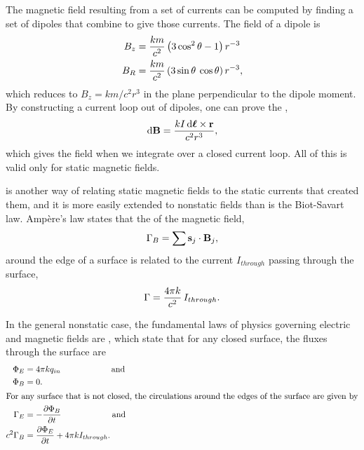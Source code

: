 	The magnetic field resulting from a set of currents can be
	computed by finding a set of dipoles that combine to give
	those currents. The field of a dipole is
	\begin{align*}
		B_z	&= \frac{km}{c^2}\left(3\cos^2\theta-1\right)r^{-3}\\
		B_R	&= \frac{km}{c^2}\left(3\sin\theta\:\cos\theta\right)r^{-3},\\
	\end{align*}
	which reduces to $B_z=km/c^2r^3$ in the plane perpendicular to the
	dipole moment. By constructing a current loop out of dipoles, 
	one can prove the ,
	\begin{equation*}
	  \operatorname{d\!} \mathbf{B} = \frac{kI\operatorname{d\!} \boldsymbol{\ell}\times\mathbf{r}}{c^2r^3},
	\end{equation*}
	which gives the field when we integrate over a closed current loop.
	All of this is valid only for static magnetic fields.
	
	 is another way of relating static magnetic fields to the static currents
	that created them, and it is more easily extended to nonstatic fields than is the
	Biot-Savart law. Amp\`{e}re's law states that the  of the magnetic
	field,
	\begin{equation*}
		\Gamma_B = \sum \mathbf{s}_j\cdot\mathbf{B}_j,
	\end{equation*}
	around the edge of a surface is related to the current $I_{through}$ passing through
	the surface,
	\begin{equation*}
		\Gamma = \frac{4\pi k}{c^2}\,I_{through}.
	\end{equation*}

	In the general nonstatic case, the fundamental laws of physics governing
	electric and magnetic fields are , which state that
	for any closed surface, the fluxes through the surface are
	\begin{align*}
		\Phi_E		&= 4\pi kq_{in} \qquad\qquad\qquad \text{and}\\
		\Phi_B		&= 0.\\
	\intertext{For any surface that is not closed, the circulations 
	around the edges of the surface are given by}
		\Gamma_E 	&= -\frac{\partial\Phi_B}{\partial t}  \qquad\qquad\qquad \text{and} \\
		c^2\Gamma_B 	&= \frac{\partial\Phi_E}{\partial t}  + 4\pi k I_{through}.
	\end{align*}

